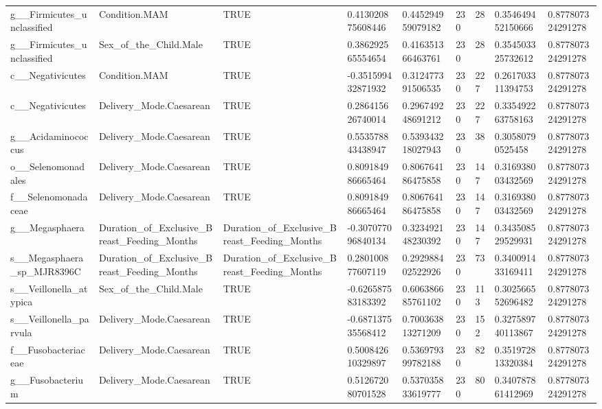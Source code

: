 \begin{longtable}{lllllllll}
g\_\_Firmicutes\_unclassified & Condition.MAM & TRUE & 0.413020875608446 & 0.445294959079182 & 230 & 28 & 0.354649452150666 & 0.877807324291278 \\
g\_\_Firmicutes\_unclassified & Sex\_of\_the\_Child.Male & TRUE & 0.386292565554654 & 0.416351366463761 & 230 & 28 & 0.354503325732612 & 0.877807324291278 \\
c\_\_Negativicutes & Condition.MAM & TRUE & -0.351599432871932 & 0.312477391506535 & 230 & 227 & 0.261703311394753 & 0.877807324291278 \\
c\_\_Negativicutes & Delivery\_Mode.Caesarean & TRUE & 0.286415626740014 & 0.296749248691212 & 230 & 227 & 0.335492263758163 & 0.877807324291278 \\
g\_\_Acidaminococcus & Delivery\_Mode.Caesarean & TRUE & 0.553578843438947 & 0.539343218027943 & 230 & 38 & 0.30580790525458 & 0.877807324291278 \\
o\_\_Selenomonadales & Delivery\_Mode.Caesarean & TRUE & 0.809184986665464 & 0.806764186475858 & 230 & 147 & 0.316938003432569 & 0.877807324291278 \\
f\_\_Selenomonadaceae & Delivery\_Mode.Caesarean & TRUE & 0.809184986665464 & 0.806764186475858 & 230 & 147 & 0.316938003432569 & 0.877807324291278 \\
g\_\_Megasphaera & Duration\_of\_Exclusive\_Breast\_Feeding\_Months & Duration\_of\_Exclusive\_Breast\_Feeding\_Months & -0.307077096840134 & 0.323492148230392 & 230 & 147 & 0.343508529529931 & 0.877807324291278 \\
s\_\_Megasphaera\_sp\_MJR8396C & Duration\_of\_Exclusive\_Breast\_Feeding\_Months & Duration\_of\_Exclusive\_Breast\_Feeding\_Months & 0.280100877607119 & 0.292988402522926 & 230 & 73 & 0.340091433169411 & 0.877807324291278 \\
s\_\_Veillonella\_atypica & Sex\_of\_the\_Child.Male & TRUE & -0.626587583183392 & 0.606386685761102 & 230 & 113 & 0.302566552696482 & 0.877807324291278 \\
s\_\_Veillonella\_parvula & Delivery\_Mode.Caesarean & TRUE & -0.687137535568412 & 0.700363813271209 & 230 & 152 & 0.327589740113867 & 0.877807324291278 \\
f\_\_Fusobacteriaceae & Delivery\_Mode.Caesarean & TRUE & 0.500842610329897 & 0.536979399782188 & 230 & 82 & 0.351972813320384 & 0.877807324291278 \\
g\_\_Fusobacterium & Delivery\_Mode.Caesarean & TRUE & 0.512672080701528 & 0.537035833619777 & 230 & 80 & 0.340787861412969 & 0.877807324291278 \\

\end{longtable}
